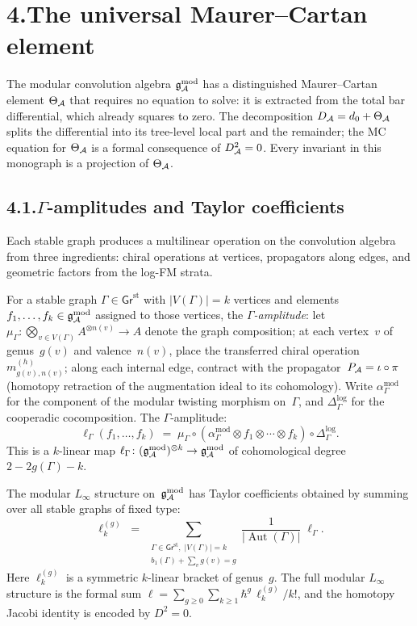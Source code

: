 \section*{4.\quad The universal Maurer--Cartan element}

\medskip

\noindent
The modular convolution algebra $\mathfrak{g}_{\mathcal{A}}^{\mathrm{mod}}$ has a distinguished
Maurer--Cartan element $\Theta_{\mathcal{A}}$ that requires no equation to
solve: it is extracted from the total bar differential, which
already squares to zero. The decomposition $D_{\mathcal{A}} = d_0 + \Theta_{\mathcal{A}}$
splits the differential into its tree-level local part and the
remainder; the MC equation for $\Theta_{\mathcal{A}}$ is a formal consequence
of $D_{\mathcal{A}}^2 = 0$. Every invariant in this monograph is a projection
of $\Theta_{\mathcal{A}}$.

\subsection*{4.1.\enspace $\Gamma$-amplitudes and Taylor coefficients}

Each stable graph produces a multilinear operation on the convolution
algebra from three ingredients: chiral operations at vertices,
propagators along edges, and geometric factors from the log-FM
strata.

For a stable graph $\Gamma\in\mathsf{Gr}^{\mathrm{st}}$ with
$|V(\Gamma)|=k$ vertices and elements $f_1,\dots,f_k\in\mathfrak{g}_{\mathcal{A}}^{\mathrm{mod}}$
assigned to those vertices, the \emph{$\Gamma$-amplitude}:
let $\mu_\Gamma\colon\bigotimes_{v\in V(\Gamma)}A^{\otimes n(v)}\to A$
denote the graph composition; at each vertex~$v$ of genus~$g(v)$ and
valence~$n(v)$, place the transferred chiral operation
$m^{(h)}_{g(v),n(v)}$; along each internal edge, contract with the
propagator~$P_{\mathcal{A}}=\iota\circ\pi$ (homotopy retraction of the
augmentation ideal to its cohomology). Write
$\alpha^{\mathrm{mod}}_\Gamma$ for the component of the modular
twisting morphism on~$\Gamma$, and
$\Delta^{\log}_\Gamma$ for the cooperadic cocomposition.
The $\Gamma$-amplitude:
\[
\ell_\Gamma(f_1,\dots,f_k)
\;=\;
\mu_\Gamma\circ
(\alpha^{\mathrm{mod}}_\Gamma\otimes f_1\otimes\cdots\otimes f_k)
\circ\Delta^{\log}_\Gamma.
\]
This is a $k$-linear map
$\ell_\Gamma\colon(\mathfrak{g}_{\mathcal{A}}^{\mathrm{mod}})^{\otimes k}\to\mathfrak{g}_{\mathcal{A}}^{\mathrm{mod}}$ of cohomological
degree $2-2g(\Gamma)-k$.

The modular $L_\infty$ structure on~$\mathfrak{g}_{\mathcal{A}}^{\mathrm{mod}}$ has Taylor coefficients
obtained by summing over all stable graphs of fixed type:
\[
\ell_k^{(g)}
\;=\;
\sum_{\substack{
\Gamma\in\mathsf{Gr}^{\mathrm{st}},\;|V(\Gamma)|=k\\
b_1(\Gamma)+\sum_v g(v)=g}}
\frac{1}{|\operatorname{Aut}(\Gamma)|}\;\ell_\Gamma.
\]
Here $\ell_k^{(g)}$ is a symmetric $k$-linear bracket of genus~$g$.
The full modular $L_\infty$ structure is the formal sum
$\ell=\sum_{g\ge 0}\sum_{k\ge 1}\hbar^g\,\ell_k^{(g)}/k!$, and the
homotopy Jacobi identity is encoded by $D^2=0$.

